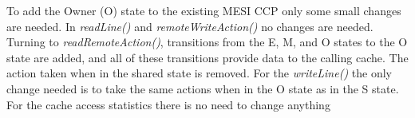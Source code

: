 To add the Owner (O) state to the existing MESI CCP only some small changes are needed. In \textit{readLine()} and \textit{remoteWriteAction()} no changes are needed. Turning to \textit{readRemoteAction()}, transitions from the E, M, and O states to the O state are added, and all of these transitions provide data to the calling cache. The action taken when in the shared state is removed. For the \textit{writeLine()} the only change needed is to take the same actions when in the O state as in the S state. For the cache access statistics there is no need to change anything